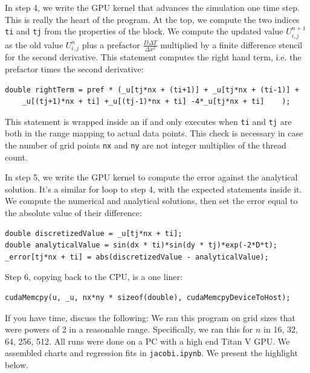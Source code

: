 \documentclass[11pt]{article}
\newcommand{\tty}[1]{\texttt{#1}}
\begin{document}
In step 4, we write the GPU kernel that advances the simulation one time step.
This is really the heart of the program.  
At the top, we compute the two indices \tty{ti} and \tty{tj} from the properties of the block.
We compute the updated value $U_{i,j}^{n+1}$ as the old value $U_{i,j}^{n}$ plus a prefactor
$\frac{D\Delta T}{\Delta x^2}$ multiplied by a finite difference stencil for the second derivative.
This statement computes the right hand term, i.e. the prefactor times the second derivative:
\begin{lstlisting}[style=CodeSnippet]
double rightTerm = pref * (_u[tj*nx + (ti+1)] + _u[tj*nx + (ti-1)] +
	_u[(tj+1)*nx + ti] +_u[(tj-1)*nx + ti] -4*_u[tj*nx + ti]	);
\end{lstlisting}
This statement is wrapped inside an if and only executes when \tty{ti} and \tty{tj} are both
in the range mapping to actual data points.  This check is necessary in case
the number of grid points \tty{nx} and \tty{ny} are not integer multiplies of the thread count.

In step 5, we write the GPU kernel to compute the error against the analytical solution.
It's a similar for loop to step 4, with the expected statements inside it.
We compute the numerical and analytical solutions, then set the error
equal to the absolute value of their difference:
\begin{lstlisting}[style=CodeSnippet]
double discretizedValue = _u[tj*nx + ti];
double analyticalValue = sin(dx * ti)*sin(dy * tj)*exp(-2*D*t);
_error[tj*nx + ti] = abs(discretizedValue - analyticalValue);
\end{lstlisting}
Step 6, copying back to the CPU, is a one liner:
\begin{lstlisting}[style=CodeSnippet]
cudaMemcpy(u, _u, nx*ny * sizeof(double), cudaMemcpyDeviceToHost);
\end{lstlisting}

    If you have time, discuss the following:
We ran this program on grid sizes that were powers of 2 in a reasonable range.
Specifically, we ran this for $n$ in 16, 32, 64, 256, 512.
All runs were done on a PC with a high end Titan V GPU.
We assembled charts and regression fits in \tty{jacobi.ipynb}.
We present the highlight below.
\end{document}
